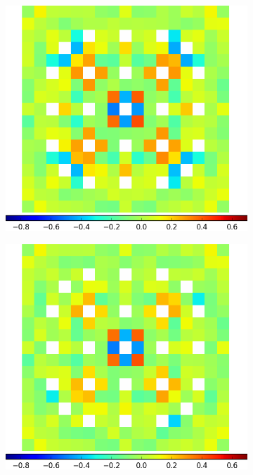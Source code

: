 \begin{figure}[h!]
\begin{subfigure}{0.45\textwidth}
  \caption{}
  \label{fig:chap11-assm-3.1-20BPs-capt-pinch-2}
\end{subfigure}
\begin{subfigure}{0.45\textwidth}
  \centering
  \includegraphics[width=\linewidth]{figures/results/assm-31-20BPs/no-transform/capt-err-pinch-agglomerative-(6)}
  \caption{}
  \label{fig:chap11-assm-3.1-20BPs-capt-pinch-6}
\end{subfigure}%
\begin{subfigure}{0.45\textwidth}
  \centering
  \includegraphics[width=\linewidth]{figures/results/assm-31-20BPs/no-transform/capt-err-pinch-agglomerative-(10)}

\end{subfigure}
\end{figure}
